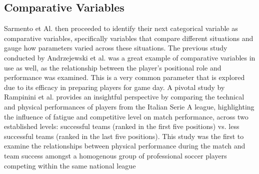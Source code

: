 \subsection{Comparative Variables}
Sarmento et Al. then proceeded to identify their next categorical variable as comparative variables, specifically variables that compare different situations and gauge how parameters varied across these situations. The previous study conducted by Andrzejewski et al. was a great example of comparative variables in use as well, as the relationship between the player’s positional role and performance was examined. This is a very common parameter that is explored due to its efficacy in preparing players for game day. A pivotal study by Rampinini et al. \cite{Rampinini2009} provides an insightful perspective by comparing the technical and physical performances of players from the Italian Serie A league, highlighting the influence of fatigue and competitive level on match performance, across two established levels: successful teams (ranked in the
first five positions) vs. less successful teams (ranked in the last five positions).
This study was the first to examine the relationships between physical performance during the match and team success amongst a homogenous group of professional soccer players competing within the same national league

